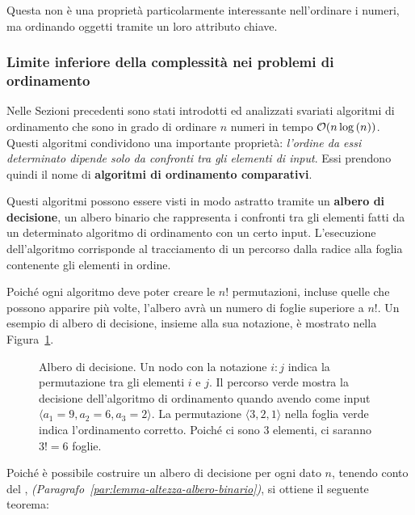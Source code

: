 \documentclass[italian, 10pt]{article}
\begin{document}
Questa non è una proprietà particolarmente interessante nell'ordinare i numeri, ma ordinando oggetti tramite un loro attributo chiave.

\subsubsection{Limite inferiore della complessità nei problemi di ordinamento}

Nelle Sezioni precedenti sono stati introdotti ed analizzati svariati algoritmi di ordinamento che sono in grado di ordinare \(n\) numeri in tempo \(\mathcal{O}(n \log{(n)})\).
Questi algoritmi condividono una importante proprietà: \textit{l'ordine da essi determinato dipende solo da confronti tra gli elementi di input}.
Essi prendono quindi il nome di \textbf{algoritmi di ordinamento comparativi}.

Questi algoritmi possono essere visti in modo astratto tramite un \textbf{albero di decisione}, un albero binario che rappresenta i confronti tra gli elementi fatti da un determinato algoritmo di ordinamento con un certo input.
L'esecuzione dell'algoritmo corrisponde al tracciamento di un percorso dalla radice alla foglia contenente gli elementi in ordine.

Poiché ogni algoritmo deve poter creare le \(n!\) permutazioni, incluse quelle che possono apparire più volte, l'albero avrà un numero di foglie superiore a \(n!\).
Un esempio di albero di decisione, insieme alla sua notazione, è mostrato nella Figura~\ref{fig:albero-di-decisione-esempio}.

\begin{figure}[htbp]
  \bigskip
  \centering
  \caption{Albero di decisione. Un nodo con la notazione \(i : j\) indica la permutazione tra gli elementi \(i\) e \(j\). Il percorso verde mostra la decisione dell'algoritmo di ordinamento quando avendo come input \(\langle a_1 = 9, a_2 = 6, a_3  = 2\rangle\). La permutazione \(\langle 3, 2, 1 \rangle\) nella foglia verde indica l'ordinamento corretto. Poiché ci sono \(3\) elementi, ci saranno \(3! = 6\) foglie.}
  \label{fig:albero-di-decisione-esempio}
  \bigskip
\end{figure}

Poiché è possibile costruire un albero di decisione per ogni dato \(n\), tenendo conto del , \textit{(Paragrafo~\ref{par:lemma-altezza-albero-binario})}, si ottiene il seguente teorema:

\end{document}

